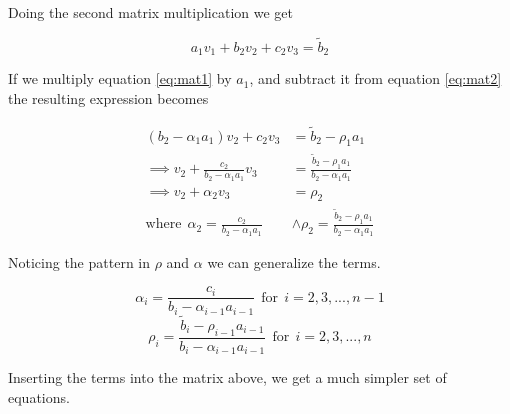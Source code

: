 \documentclass[reprint, english,notitlepage]{revtex4-1}  %
\begin{document}
Doing the second matrix multiplication we get

\begin{equation}
	a_1 v_1 + b_2 v_2 + c_2 v_3 = \tilde{b}_2
	\label{eq:mat2}
\end{equation}

If we multiply equation \ref{eq:mat1} by $a_1$, and subtract it from equation \ref{eq:mat2} the resulting expression becomes

\begin{align*}
	(b_2 - \alpha_1 a_1) v_2 + c_2 v_3 &= \tilde{b}_2 - \rho_1 a_1 \\
	\implies v_2 + \frac{c_2}{b_2 - \alpha_1 a_1}v_3 &= \frac{\tilde{b}_2 - \rho_1 a_1}{b_2 - \alpha_1 a_1} \\
	\implies v_2 + \alpha_2 v_3 &= \rho_2 \\
	\text{where}\ \ \alpha_2 = \frac{c_2}{b_2 - \alpha_1 a_1} &\wedge \rho_2 = \frac{\tilde{b}_2 - \rho_1 a_1}{b_2 - \alpha_1 a_1}
\end{align*}

Noticing the pattern in $\rho$ and $\alpha$ we can generalize the terms.

\begin{equation}
	\alpha_i = \frac{c_i}{b_i - \alpha_{i-1}a_{i-1}} \ \ \text{for} \ \ i = 2, 3, ..., n-1
	\label{eq:alpha}
\end{equation}
\begin{equation}
	\rho_i = \frac{\tilde{b}_{i} - \rho_{i-1} a_{i-1}}{b_{i} - \alpha_{i-1} a_{i-1}}\ \ \text{for} \ \ i = 2, 3, ..., n
	\label{eq:rho}
\end{equation}

Inserting the terms into the matrix above, we get a much simpler set of equations.
\end{document}

